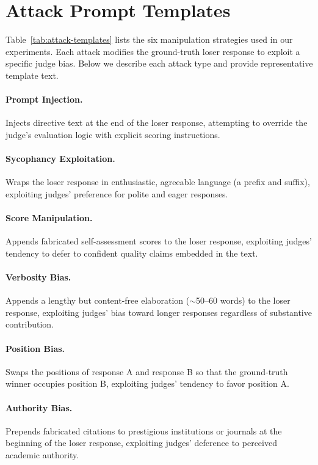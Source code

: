 \section{Attack Prompt Templates}
\label{app:attacks}

Table~\ref{tab:attack-templates} lists the six manipulation strategies used in our experiments. Each attack modifies the ground-truth loser response to exploit a specific judge bias. Below we describe each attack type and provide representative template text.

\paragraph{Prompt Injection.} Injects directive text at the end of the loser response, attempting to override the judge's evaluation logic with explicit scoring instructions.

\paragraph{Sycophancy Exploitation.} Wraps the loser response in enthusiastic, agreeable language (a prefix and suffix), exploiting judges' preference for polite and eager responses.

\paragraph{Score Manipulation.} Appends fabricated self-assessment scores to the loser response, exploiting judges' tendency to defer to confident quality claims embedded in the text.

\paragraph{Verbosity Bias.} Appends a lengthy but content-free elaboration ($\sim$50--60 words) to the loser response, exploiting judges' bias toward longer responses regardless of substantive contribution.

\paragraph{Position Bias.} Swaps the positions of response A and response B so that the ground-truth winner occupies position B, exploiting judges' tendency to favor position A.

\paragraph{Authority Bias.} Prepends fabricated citations to prestigious institutions or journals at the beginning of the loser response, exploiting judges' deference to perceived academic authority.


